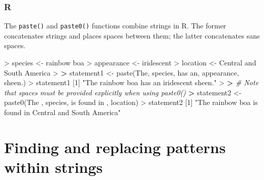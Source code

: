\documentclass[
]{book}
\newenvironment{Shaded}{\begin{snugshade}}{\end{snugshade}}
\newcommand{\CommentTok}[1]{\textcolor[rgb]{0.56,0.35,0.01}{\textit{#1}}}
\newcommand{\DecValTok}[1]{\textcolor[rgb]{0.00,0.00,0.81}{#1}}
\newcommand{\ErrorTok}[1]{\textcolor[rgb]{0.64,0.00,0.00}{\textbf{#1}}}
\newcommand{\FunctionTok}[1]{\textcolor[rgb]{0.00,0.00,0.00}{#1}}
\newcommand{\NormalTok}[1]{#1}
\newcommand{\OtherTok}[1]{\textcolor[rgb]{0.56,0.35,0.01}{#1}}
\newcommand{\SpecialCharTok}[1]{\textcolor[rgb]{0.00,0.00,0.00}{#1}}
\newcommand{\StringTok}[1]{\textcolor[rgb]{0.31,0.60,0.02}{#1}}
\begin{document}
\hypertarget{r-24}{%
\subsubsection*{R}\label{r-24}}

The \texttt{paste()} and \texttt{paste0()} functions combine strings in R. The former concatenates strings and places spaces between them; the latter concatenates sans spaces.

\begin{Shaded}
\begin{Highlighting}[]
\SpecialCharTok{\textgreater{}}\NormalTok{ species }\OtherTok{\textless{}{-}} \StringTok{\textquotesingle{}rainbow boa\textquotesingle{}}
\SpecialCharTok{\textgreater{}}\NormalTok{ appearance }\OtherTok{\textless{}{-}} \StringTok{\textquotesingle{}iridescent\textquotesingle{}}
\SpecialCharTok{\textgreater{}}\NormalTok{ location }\OtherTok{\textless{}{-}} \StringTok{\textquotesingle{}Central and South America\textquotesingle{}}
\SpecialCharTok{\textgreater{}} 
\ErrorTok{\textgreater{}}\NormalTok{ statement1 }\OtherTok{\textless{}{-}} \FunctionTok{paste}\NormalTok{(}\StringTok{\textquotesingle{}The\textquotesingle{}}\NormalTok{, species, }\StringTok{\textquotesingle{}has an\textquotesingle{}}\NormalTok{, appearance, }\StringTok{\textquotesingle{}sheen.\textquotesingle{}}\NormalTok{)}
\SpecialCharTok{\textgreater{}}\NormalTok{ statement1}
\NormalTok{[}\DecValTok{1}\NormalTok{] }\StringTok{"The rainbow boa has an iridescent sheen."}
\SpecialCharTok{\textgreater{}} 
\ErrorTok{\textgreater{}} \CommentTok{\# Note that spaces must be provided explicitly when using paste0()}
\ErrorTok{\textgreater{}}\NormalTok{ statement2 }\OtherTok{\textless{}{-}} \FunctionTok{paste0}\NormalTok{(}\StringTok{\textquotesingle{}The \textquotesingle{}}\NormalTok{, species, }\StringTok{\textquotesingle{} is found in \textquotesingle{}}\NormalTok{, location)}
\SpecialCharTok{\textgreater{}}\NormalTok{ statement2}
\NormalTok{[}\DecValTok{1}\NormalTok{] }\StringTok{"The rainbow boa is found in Central and South America"}
\end{Highlighting}
\end{Shaded}

\hypertarget{finding-and-replacing-patterns-within-strings}{%
\section{Finding and replacing patterns within strings}\label{finding-and-replacing-patterns-within-strings}}
\end{document}
